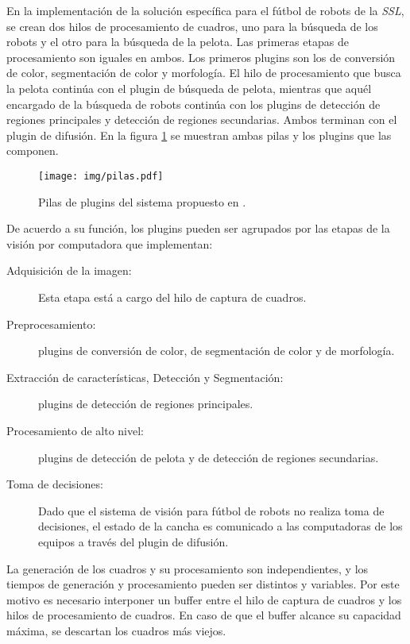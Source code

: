 En la implementación de la solución específica para el fútbol de robots de la
\emph{SSL}, se crean dos hilos de procesamiento de cuadros, uno para la búsqueda
de los robots y el otro para la búsqueda de la pelota. Las primeras etapas de
procesamiento son iguales en ambos. Los primeros plugins son los de conversión
de color, segmentación de color y morfología. El hilo de procesamiento que busca
la pelota continúa con el plugin de búsqueda de pelota, mientras que aquél
encargado de la búsqueda de robots continúa con los plugins de detección de
regiones principales y detección de regiones secundarias. Ambos terminan con el
plugin de difusión. En la figura \ref{pilasPlugins} se muestran ambas pilas y
los plugins que las componen.

\begin{figure}[!h]

	\texttt{[image: img/pilas.pdf]}

	\caption{Pilas de plugins del sistema propuesto en \cite{torres2014}.}

	\label{pilasPlugins}

\end{figure}


De acuerdo a su función, los plugins pueden ser agrupados por las etapas de la
visión por computadora que implementan:

\begin{description}

	\item[Adquisición de la imagen:] Esta etapa está a cargo del hilo de
		captura de cuadros.

	\item[Preprocesamiento:] plugins de conversión de color, de segmentación
		de color y de morfología.

	\item[Extracción de características, Detección y Segmentación:] plugins
		de detección de regiones principales.

	\item[Procesamiento de alto nivel:] plugins de detección de pelota y de
		detección de regiones secundarias.

	\item[Toma de decisiones:] Dado que el sistema de visión para fútbol de
		robots no realiza toma de decisiones, el estado de la cancha es
		comunicado a las computadoras de los equipos a través del plugin
		de difusión.

\end{description}

La generación de los cuadros y su procesamiento son independientes, y los
tiempos de generación y procesamiento pueden ser distintos y variables. Por este
motivo es necesario interponer un buffer entre el hilo de captura de cuadros y
los hilos de procesamiento de cuadros. En caso de que el buffer alcance su
capacidad máxima, se descartan los cuadros más viejos.
